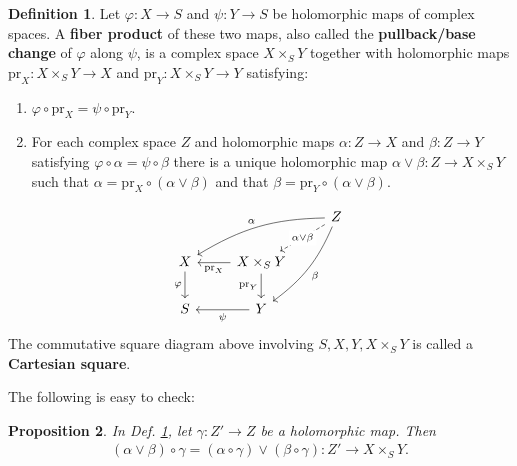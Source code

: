 \documentclass[12pt,b5paper,notitlepage]{report}
\theoremstyle{definition}
\newtheorem{df}{Definition}[section]
\theoremstyle{plain}
\newtheorem{pp}[df]{Proposition}
\newcommand{\pr}{\mathrm {pr}}
\numberwithin{equation}{section}
\begin{document}
\begin{df}\label{lb36}
Let $\varphi:X\rightarrow S$ and $\psi:Y\rightarrow S$ be holomorphic maps of complex spaces. A \textbf{fiber product} of these two maps, also called the \textbf{pullback/base change} of $\varphi$ along $\psi$,  is a complex space $X\times_SY$ together with holomorphic maps $\pr_X:X\times_SY\rightarrow X$ and $\pr_Y:X\times_SY\rightarrow Y$ satisfying:
\begin{enumerate}[label=(\arabic*)]
\item $\varphi\circ\pr_X=\psi\circ\pr_Y$.
\item For each complex space $Z$ and holomorphic maps $\alpha:Z\rightarrow X$ and $\beta:Z\rightarrow Y$ satisfying $\varphi\circ\alpha=\psi\circ\beta$ there is a unique holomorphic map $\alpha\vee\beta:Z\rightarrow X\times_SY$  such that $\alpha=\pr_X\circ(\alpha\vee\beta)$ and that $\beta=\pr_Y\circ(\alpha\vee\beta)$.
\end{enumerate}
\begin{equation}
\begin{tikzcd}
                  &                                    & Z \arrow[ld, "\alpha\vee\beta" description, dashed] \arrow[lld, "\alpha"',bend right=15] \arrow[ldd, "\beta", bend left=15] \\
X \arrow[d, "\varphi"'] & X\times_SY \arrow[l, "\pr_X"] \arrow[d, "\pr_Y"'] &                                                               \\
S                 & Y \arrow[l, "\psi"]                  &                                                              
\end{tikzcd}
\end{equation}
The commutative square diagram above involving $S,X,Y,X\times_SY$ is called a \textbf{Cartesian square}.    \hfill\qedsymbol 
\end{df}

The following is easy to check:

\begin{pp}\label{lb37}
In Def. \ref{lb36}, let $\gamma:Z'\rightarrow Z$ be a holomorphic map. Then
\begin{align}
(\alpha\vee\beta)\circ\gamma=(\alpha\circ\gamma)\vee(\beta\circ\gamma):Z'\rightarrow X\times_SY.
\end{align}
\end{pp}
\end{document}
